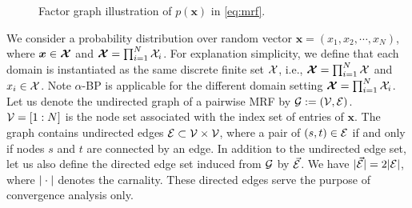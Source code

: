 \begin{figure}
  \begin{centering}
    \vskip -0.1in
    \caption{Factor graph illustration of $p(\bm{x})$ in \eqref{eq:mrf}.}\label{fig:factor-graph}
  \end{centering}
\end{figure}


We consider a probability distribution over random vector $\bm{x} = \left(  x_1, x_2, \cdots,  x_N  \right)$, where $\bm{x} \in \bm{\mathcal{X}}$ and $\bm{\mathcal{X}}=\prod_{i=1}^N\mathcal{X}_i$. For explanation simplicity, we define that each domain is instantiated as the same discrete finite set $\mathcal{X}$, i.e., $\bm{\mathcal{X}}=\prod_{i=1}^N\mathcal{X}$ and $x_i \in \mathcal{X}$. Note $\alpha$-BP is applicable for the different domain setting $\bm{\mathcal{X}}=\prod_{i=1}^N\mathcal{X}_i$. Let us denote the undirected graph of a pairwise MRF by $\mathcal{G}:=(\mathcal{V}, \mathcal{E})$. $\mathcal{V}=\left[ 1 : N \right]$ is the node set associated with the index set of entries of $\bm{x}$. The graph contains undirected edges $\mathcal{E} \subset \mathcal{V} \times \mathcal{V}$, where a pair of $(s, t) \in \mathcal{E}$ if and only if nodes $s$ and $t$ are connected by an edge. In addition to the undirected edge set, let us also define the directed edge set induced from $\mathcal{G}$ by $\vec{\mathcal{E}}$. We have $| \vec{\mathcal{E}} | = 2| \mathcal{E} |$, where $| \cdot |$ denotes the carnality. These directed edges serve the purpose of convergence analysis only.



